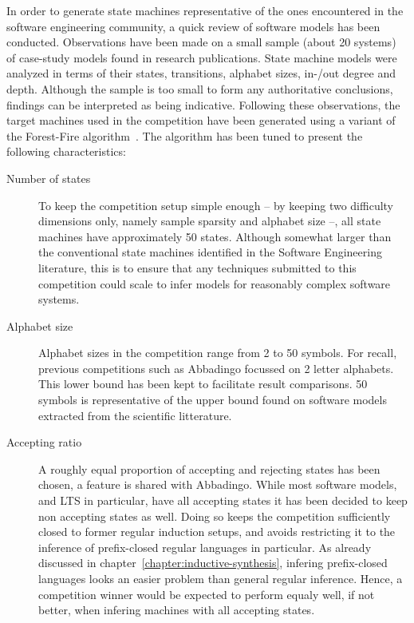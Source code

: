 In order to generate state machines representative of the ones encountered in the software engineering community, a quick review of software models has been conducted. Observations have been made on a small sample (about 20 systems) of case-study models found in research publications. State machine models were analyzed in terms of their states, transitions, alphabet sizes, in-/out degree and depth. Although the sample is too small to form any authoritative conclusions, findings can be interpreted as being indicative. Following these observations, the target machines used in the competition have been generated using a variant of the Forest-Fire algorithm~\cite{Leskovec2007}. The algorithm has been tuned to present the following characteristics:

\begin{description}

\item[Number of states] To keep the competition setup simple enough -- by keeping two difficulty dimensions only, namely sample sparsity and alphabet size --, all state machines have approximately 50 states. Although somewhat larger than the conventional state machines identified in the Software Engineering literature, this is to ensure that any techniques submitted to this competition could scale to infer models for reasonably complex software systems. 

\item[Alphabet size] Alphabet sizes in the competition range from 2 to 50 symbols. For recall, previous competitions such as Abbadingo focussed on 2 letter alphabets. This lower bound has been kept to facilitate result comparisons. 50 symbols is representative of the upper bound found on software models extracted from the scientific litterature. 

\item[Accepting ratio] A roughly equal proportion of accepting and rejecting states has been chosen, a feature is shared with Abbadingo. While most software models, and LTS in particular, have all accepting states it has been decided to keep non accepting states as well. Doing so keeps the competition sufficiently closed to former regular induction setups, and avoids restricting it to the inference of prefix-closed regular languages in particular. As already discussed in chapter~\ref{chapter:inductive-synthesis}, infering prefix-closed languages looks an easier problem than general regular inference. Hence, a competition winner would be expected to perform equaly well, if not better, when infering machines with all accepting states.


\end{description}
